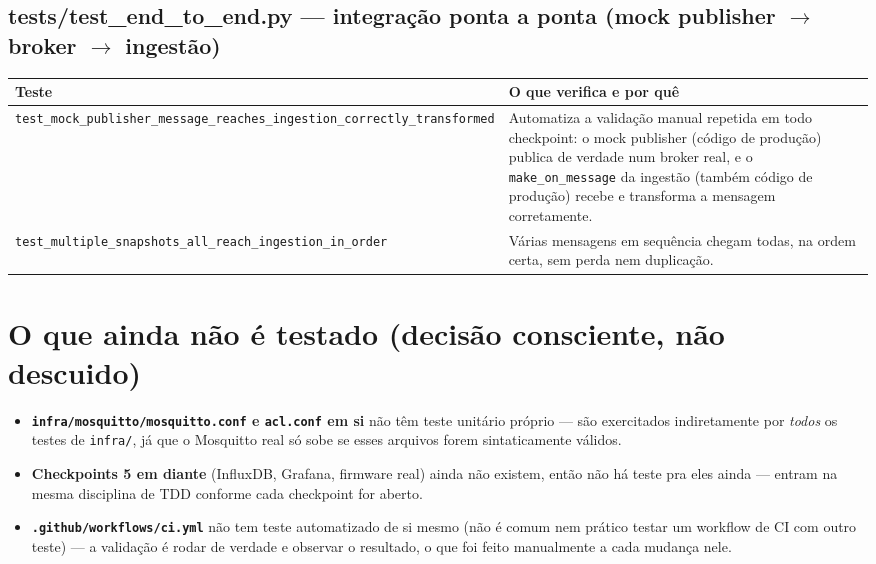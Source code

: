 \documentclass[10pt,a4paper]{article}
\begin{document}
\subsection{tests/test\_\allowbreak end\_\allowbreak to\_\allowbreak end.py --- integração ponta a ponta (mock publisher $\to$ broker $\to$ ingestão)}

\begin{center}
\begin{longtable}{L{5cm}L{9.5cm}}
\toprule
\textbf{Teste} & \textbf{O que verifica e por quê} \\
\midrule
\endhead
\texttt{test\_\allowbreak mock\_\allowbreak publisher\_\allowbreak message\_\allowbreak reaches\_\allowbreak ingestion\_\allowbreak correctly\_\allowbreak transformed} & Automatiza a validação manual repetida em todo checkpoint: o mock publisher (código de produção) publica de verdade num broker real, e o \texttt{make\_\allowbreak on\_\allowbreak message} da ingestão (também código de produção) recebe e transforma a mensagem corretamente. \\
\texttt{test\_\allowbreak multiple\_\allowbreak snapshots\_\allowbreak all\_\allowbreak reach\_\allowbreak ingestion\_\allowbreak in\_\allowbreak order} & Várias mensagens em sequência chegam todas, na ordem certa, sem perda nem duplicação. \\
\bottomrule
\end{longtable}
\end{center}

\section{O que ainda não é testado (decisão consciente, não descuido)}

\begin{itemize}
    \item \textbf{\texttt{infra/mosquitto/mosquitto.conf} e \texttt{acl.conf} em si} não têm teste unitário próprio — são exercitados indiretamente por \emph{todos} os testes de \texttt{infra/}, já que o Mosquitto real só sobe se esses arquivos forem sintaticamente válidos.
    \item \textbf{Checkpoints 5 em diante} (InfluxDB, Grafana, firmware real) ainda não existem, então não há teste pra eles ainda — entram na mesma disciplina de TDD conforme cada checkpoint for aberto.
    \item \textbf{\texttt{.github/workflows/ci.yml}} não tem teste automatizado de si mesmo (não é comum nem prático testar um workflow de CI com outro teste) — a validação é rodar de verdade e observar o resultado, o que foi feito manualmente a cada mudança nele.
\end{itemize}
\end{document}
